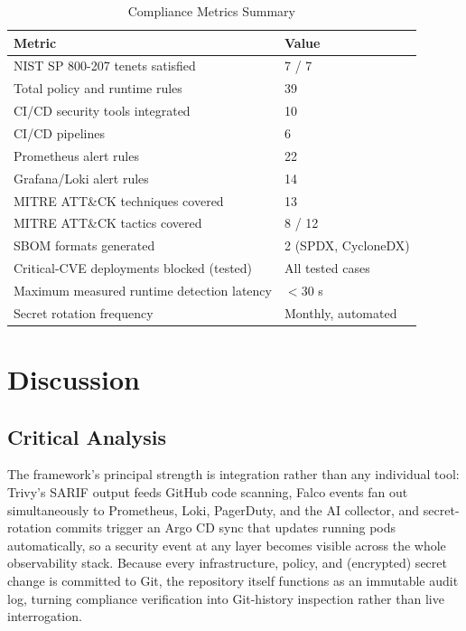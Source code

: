 \documentclass[conference]{IEEEtran}
\begin{document}
\begin{table}[!t]
\caption{Compliance Metrics Summary}
\label{tab:metrics}
\centering
\footnotesize
\begin{tabular}{@{}p{3.3cm}p{1.6cm}@{}}
\toprule
\textbf{Metric} & \textbf{Value} \\
\midrule
NIST SP 800-207 tenets satisfied & 7 / 7 \\
Total policy and runtime rules & 39 \\
CI/CD security tools integrated & 10 \\
CI/CD pipelines & 6 \\
Prometheus alert rules & 22 \\
Grafana/Loki alert rules & 14 \\
MITRE ATT\&CK techniques covered & 13 \\
MITRE ATT\&CK tactics covered & 8 / 12 \\
SBOM formats generated & 2 (SPDX, CycloneDX) \\
Critical-CVE deployments blocked (tested) & All tested cases \\
Maximum measured runtime detection latency & $<$30 s \\
Secret rotation frequency & Monthly, automated \\
\bottomrule
\end{tabular}
\end{table}

\section{Discussion}

\subsection{Critical Analysis}
The framework's principal strength is integration rather than any individual tool: Trivy's SARIF output feeds GitHub code scanning, Falco events fan out simultaneously to Prometheus, Loki, PagerDuty, and the AI collector, and secret-rotation commits trigger an Argo CD sync that updates running pods automatically, so a security event at any layer becomes visible across the whole observability stack. Because every infrastructure, policy, and (encrypted) secret change is committed to Git, the repository itself functions as an immutable audit log, turning compliance verification into Git-history inspection rather than live interrogation.
\end{document}

